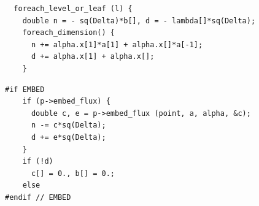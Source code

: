 \documentclass[a4paper]{article}
\newcommand{\para}[1]{\textbf{\emph{\textcolor{para}{#1}}}}
\begin{document}
\begin{multicols}{2}
  \columnbreak
  \begin{verbatim}
  foreach_level_or_leaf (l) {
    double n = - sq(Delta)*b[], d = - lambda[]*sq(Delta);
    foreach_dimension() {
      n += alpha.x[1]*a[1] + alpha.x[]*a[-1];
      d += alpha.x[1] + alpha.x[];
    }
  \end{verbatim}
\end{multicols}

\begin{center}
\end{center}

\begin{multicols}{2}
  \columnbreak
  \begin{verbatim}
#if EMBED
    if (p->embed_flux) {
      double c, e = p->embed_flux (point, a, alpha, &c);
      n -= c*sq(Delta);
      d += e*sq(Delta);
    }
    if (!d)
      c[] = 0., b[] = 0.;
    else
#endif // EMBED
  \end{verbatim}
\end{multicols}

\begin{center}
\end{center}
\end{document}
